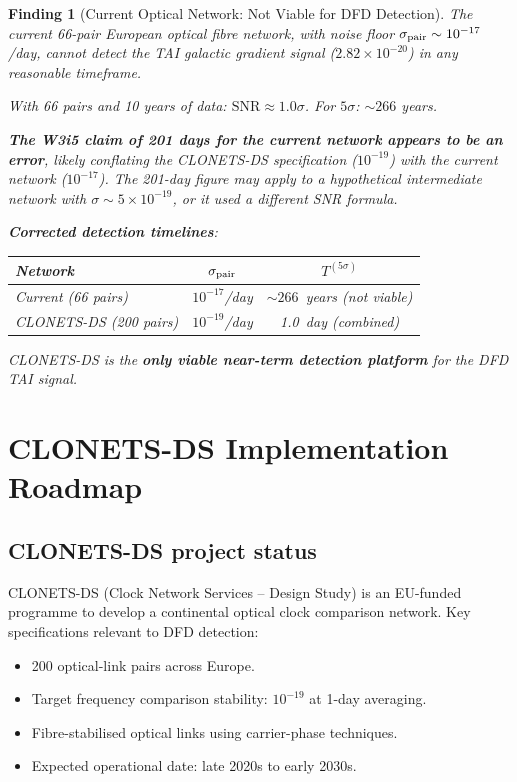 \documentclass[11pt]{article}
\newtheorem{finding}{Finding}
\newcommand{\ee}[1]{\times 10^{#1}}
\begin{document}
\begin{finding}[Current Optical Network: Not Viable for DFD Detection]
\label{find:current-not-viable}
The current 66-pair European optical fibre network, with noise floor
$\sigma_{\rm pair} \sim 10^{-17}$/day, cannot detect the TAI galactic
gradient signal ($2.82\ee{-20}$) in any reasonable timeframe.

With 66 pairs and 10 years of data: $\text{SNR} \approx 1.0\sigma$.
For $5\sigma$: $\sim 266$ years.

\textbf{The W3i5 claim of 201 days for the current network appears to
be an error}, likely conflating the CLONETS-DS specification ($10^{-19}$)
with the current network ($10^{-17}$). The 201-day figure may apply to
a hypothetical intermediate network with $\sigma \sim 5\ee{-19}$, or
it used a different SNR formula.

\textbf{Corrected detection timelines}:
\begin{center}
\begin{tabular}{lcc}
\toprule
Network & $\sigma_{\rm pair}$ & $T^{(5\sigma)}$ \\
\midrule
Current (66 pairs) & $10^{-17}$/day & $\sim 266$~years (not viable) \\
CLONETS-DS (200 pairs) & $10^{-19}$/day & 1.0~day (combined) \\
\bottomrule
\end{tabular}
\end{center}

CLONETS-DS is the \textbf{only viable near-term detection platform}
for the DFD TAI signal.
\end{finding}

\section{CLONETS-DS Implementation Roadmap}
\label{sec:CLONETS-roadmap}

\subsection{CLONETS-DS project status}

CLONETS-DS (Clock Network Services -- Design Study) is an EU-funded
programme to develop a continental optical clock comparison network.
Key specifications relevant to DFD detection:
\begin{itemize}[nosep]
\item 200 optical-link pairs across Europe.
\item Target frequency comparison stability: $10^{-19}$ at 1-day averaging.
\item Fibre-stabilised optical links using carrier-phase techniques.
\item Expected operational date: late 2020s to early 2030s.
\end{itemize}
\end{document}
